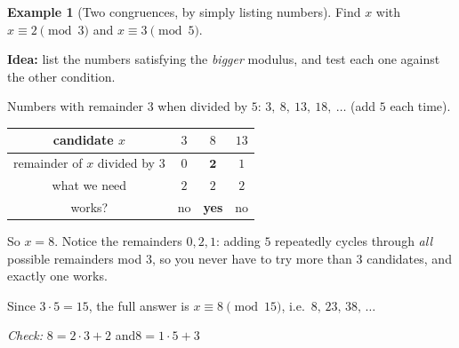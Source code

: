 \documentclass[11pt]{article}
\theoremstyle{definition}
\newtheorem{example}[theorem]{Example}
\theoremstyle{remark}
\begin{document}
\begin{example}[Two congruences, by simply listing numbers]\label{ex:qs-list}
Find $x$ with $x\equiv 2\pmod 3$ and $x\equiv 3\pmod 5$.

\smallskip
\textbf{Idea:} list the numbers satisfying the \emph{bigger} modulus, and test each one against the other condition.

Numbers with remainder $3$ when divided by $5$: $3,\ 8,\ 13,\ 18,\ \dots$ (add $5$ each time).

\begin{center}
\begin{tabular}{cccc}
\toprule
candidate $x$ & $3$ & $8$ & $13$ \\
\midrule
remainder of $x$ divided by $3$ & $0$ & $\mathbf{2}$ & $1$ \\
what we need & $2$ & $2$ & $2$ \\
works? & no & \textbf{yes} & no \\
\bottomrule
\end{tabular}
\end{center}

So $x=8$. Notice the remainders $0,2,1$: adding $5$ repeatedly cycles through \emph{all} possible remainders mod $3$, so you never have to try more than $3$ candidates, and exactly one works.

Since $3\cdot5=15$, the full answer is $x\equiv 8\pmod{15}$, i.e.\ $8,\,23,\,38,\,\dots$

\emph{Check:} $8=2\cdot 3+2$ \checkmark\quad and\quad $8=1\cdot5+3$ \checkmark
\end{example}
\end{document}

